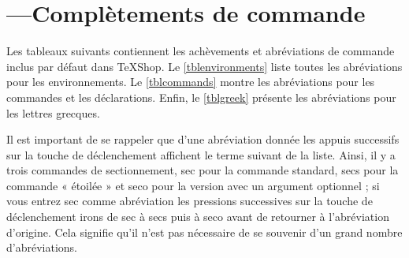 \documentclass[11pt,french]{article}
\newcommand{\TS}{\textsf{\TeX Shop}}
\newcommand{\cmd}[1]{\textsf{#1}}
\begin{document}
\section{---\quad Complètements de commande}\label{secCCTables}
%
%

Les tableaux suivants contiennent les achèvements et abréviations de commande inclus par défaut dans \TS. Le \cref{tblenvironments}  liste toutes les abréviations pour les environnements. Le \cref{tblcommands}  montre les abréviations pour les commandes et les déclarations. Enfin, le \cref{tblgreek}  présente les abréviations pour les lettres grecques.

Il est important de se rappeler que d'une abréviation donnée les appuis successifs sur la touche de déclenchement affichent le terme suivant de la liste. Ainsi, il y a trois commandes de sectionnement, \cmd{sec} pour la commande standard, \cmd{secs} pour la commande « étoilée » et \cmd{seco} pour la version avec un argument optionnel ; si vous entrez \cmd{sec} comme abréviation les pressions successives sur la touche de déclenchement irons de \cmd{sec} à \cmd{secs} puis à \cmd{seco} avant de retourner à l'abréviation d'origine. Cela signifie qu'il n'est pas nécessaire de se souvenir d'un grand nombre  d'abréviations.
\end{document}
